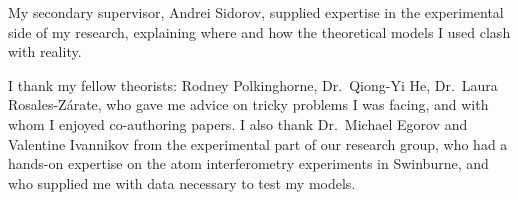 My secondary supervisor, Andrei Sidorov, supplied expertise in the experimental side of my research, explaining where and how the theoretical models I used clash with reality.

I thank my fellow theorists: Rodney Polkinghorne, Dr.~Qiong-Yi He, Dr.~Laura Rosales-Z\'arate, who gave me advice on tricky problems I was facing, and with whom I enjoyed co-authoring papers.
I also thank Dr.~Michael Egorov and Valentine Ivannikov from the experimental part of our research group, who had a hands-on expertise on the atom interferometry experiments in Swinburne, and who supplied me with data necessary to test my models.
